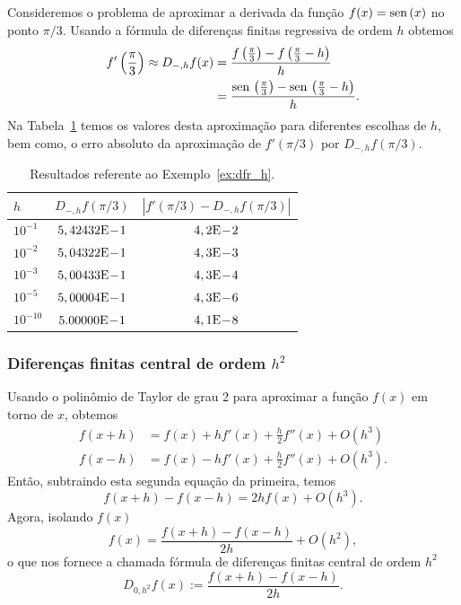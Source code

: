 \begin{ex}\label{ex:dfr_h}
  Consideremos o problema de aproximar a derivada da função $f(x) = \operatorname{sen}\,(x)$ no ponto $\pi/3$. Usando a fórmula de diferenças finitas regressiva de ordem $h$ obtemos
  \begin{align}
    f'\left(\frac{\pi}{3}\right) \approx D_{-,h}f(x) &= \frac{f\left(\frac{\pi}{3}\right)-f\left(\frac{\pi}{3}-h\right)}{h}\\
          &= \frac{\operatorname{sen}\,\left(\frac{\pi}{3}\right)-\operatorname{sen}\,\left(\frac{\pi}{3}-h\right)}{h}. 
  \end{align}
Na Tabela~\ref{tab:ex_dfr_h} temos os valores desta aproximação para diferentes escolhas de $h$, bem como, o erro absoluto da aproximação de $f'(\pi/3)$ por $D_{-,h}f(\pi/3)$.

\begin{table}[h!]
  \centering
  \caption{Resultados referente ao Exemplo~\ref{ex:dfr_h}.}
  \begin{tabular}{l|c|c}
    $h$ & $D_{-,h}f(\pi/3)$ & $|f'(\pi/3)-D_{-,h}f(\pi/3)|$\\ \hline
    $10^{-1}$ & $5,42432\mathrm{E}\!-\!1$ & $4,2\mathrm{E}\!-\!2$ \\
    $10^{-2}$ & $5,04322\mathrm{E}\!-\!1$ & $4,3\mathrm{E}\!-\!3$ \\
    $10^{-3}$ & $5,00433\mathrm{E}\!-\!1$ & $4,3\mathrm{E}\!-\!4$ \\
    $10^{-5}$ & $5,00004\mathrm{E}\!-\!1$ & $4,3\mathrm{E}\!-\!6$ \\
    $10^{-10}$ & $5.00000\mathrm{E}\!-\!1$ & $4,1\mathrm{E}\!-\!8$ \\\hline
  \end{tabular}
  \label{tab:ex_dfr_h}
\end{table}
\end{ex}

\subsubsection{Diferenças finitas central de ordem $h^2$}

Usando o polinômio de Taylor de grau 2 para aproximar a função $f(x)$ em torno de $x$, obtemos
\begin{align}
  f(x+h) &= f(x) + hf'(x) + \frac{h}{2}f''(x) + O(h^3)\\
  f(x-h) &= f(x) - hf'(x) + \frac{h}{2}f''(x) + O(h^3).
\end{align}
Então, subtraindo esta segunda equação da primeira, temos
\begin{equation}
  f(x+h)-f(x-h) = 2hf(x) + O(h^3).
\end{equation}
Agora, isolando $f(x)$
\begin{equation}
  f(x) = \frac{f(x+h)-f(x-h)}{2h} + O(h^2),
\end{equation}
o que nos fornece a chamada fórmula de diferenças finitas central de ordem $h^2$
\begin{equation}\label{eq:dfc_h2}
  D_{0,h^2}f(x) := \frac{f(x+h)-f(x-h)}{2h}.
\end{equation}

